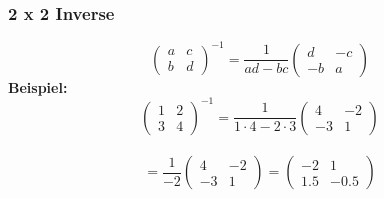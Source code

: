 \documentclass[12pt,a4paper]{article}
\begin{document}
\subsubsection{2 x 2 Inverse}
\[
\begin{pmatrix}
    a & c \\
    b & d
\end{pmatrix}^{-1}
=
\frac{1}{ad - bc}
\begin{pmatrix}
    d & -c \\
    -b & a
\end{pmatrix}
\]
\textbf{Beispiel:}
\[
\begin{pmatrix}
    1 & 2 \\
    3 & 4
\end{pmatrix}^{-1}
=
\frac{1}{1 \cdot 4 - 2 \cdot 3}
\begin{pmatrix}
    4 & -2 \\
    -3 & 1
\end{pmatrix}
\]
\\
\[
=
\frac{1}{-2}
\begin{pmatrix}
    4 & -2 \\
    -3 & 1
\end{pmatrix}
=
\begin{pmatrix}
    -2 & 1 \\
    1.5 & -0.5
\end{pmatrix}
\]
\end{document}
